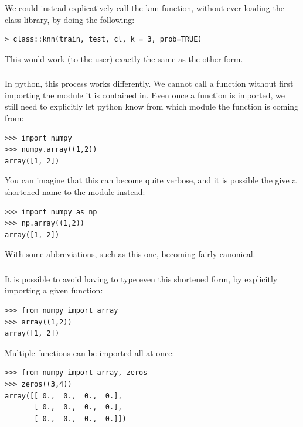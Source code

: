\documentclass[xetex,mathserif,serif,aspectratio=169]{beamer}
\begin{document}
\begin{frame}[fragile] \frametitle{} \oldB \small

We could instead explicatively call the knn function,
without ever loading the class library, by doing the
following:
\begin{verbatim}
> class::knn(train, test, cl, k = 3, prob=TRUE)
\end{verbatim}
This would work (to the user) exactly the same as the
other form.

\end{frame}

\begin{frame}[fragile] \frametitle{} \oldB \small

In python, this process works differently. We cannot
call a function without first importing the module
it is contained in. Even once a function is imported,
we still need to explicitly let python know from
which module the function is coming from:
\begin{verbatim}
>>> import numpy
>>> numpy.array((1,2))
array([1, 2])
\end{verbatim}
\pause You can imagine that this can become quite verbose,
and it is possible the give a shortened name to the module
instead:
\begin{verbatim}
>>> import numpy as np
>>> np.array((1,2))
array([1, 2])
\end{verbatim}
With some abbreviations, such as this one, becoming fairly
canonical.

\end{frame}

\begin{frame}[fragile] \frametitle{} \oldB \small

It is possible to avoid having to type even this shortened
form, by explicitly importing a given function:
\begin{verbatim}
>>> from numpy import array
>>> array((1,2))
array([1, 2])
\end{verbatim}
\pause Multiple functions can be imported all at once:
\begin{verbatim}
>>> from numpy import array, zeros
>>> zeros((3,4))
array([[ 0.,  0.,  0.,  0.],
       [ 0.,  0.,  0.,  0.],
       [ 0.,  0.,  0.,  0.]])
\end{verbatim}

\end{frame}
\end{document}
